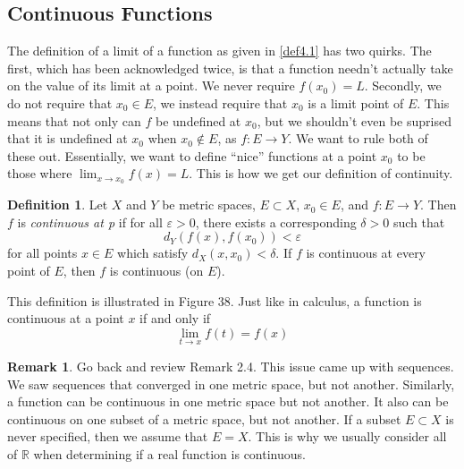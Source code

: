 \documentclass{article}
\newcommand{\R}{\mathbb{R}}
\theoremstyle{definition}
\newtheorem{definition}{Definition}[section]
\newtheorem{remark}{Remark}[section]
\begin{document}
	\subsection{Continuous Functions}
	The definition of a limit of a function as given in \cref{def4.1} has two quirks. The first, which has been acknowledged twice, is that a function needn't actually take on the value of its limit at a point. We never require $ f(x_0)=L $. Secondly, we do not require that $ x_0\in E $, we instead require that $ x_0$ is a limit point of $ E $. This means that not only can $ f $ be undefined at $ x_0$, but we shouldn't even be suprised that it is undefined at $ x_0 $ when $ x_0\notin E $, as $ f:E\to Y $. We want to rule both of these out. Essentially, we want to define ``nice'' functions at a point $ x_0 $ to be those where $ \lim_{x\to x_0}f(x)=L $. This is how we get our definition of continuity. 
	\begin{definition}\label{def4.2}
		Let $ X $ and $ Y $ be metric spaces,  $ E\subset X $, $ x_0\in E $, and $ f:E\to Y $. Then $ f $ is \textit{\color{red}continuous at p} if for all $ \varepsilon>0 $, there exists a corresponding $ \delta>0 $ such that $$ d_Y(f(x),f(x_0))<\varepsilon $$ for all points $ x\in E $ which satisfy $ d_X(x,x_0)<\delta $. If $ f $ is continuous at every point of $ E $, then $ f $ is {\color{red}continuous (on $ E $)}. 
	\end{definition}
	This definition is illustrated in Figure 38. Just like in calculus, a function is continuous at a point $ x $ if and only if $$\lim\limits_{t\to x}f(t)=f(x) $$
	\begin{remark}
		Go back and review Remark 2.4. This issue came up with sequences. We saw sequences that converged in one metric space, but not another. Similarly, a function can be continuous in one metric space but not another. It also can be continuous on one subset of a metric space, but not another. If a subset $ E\subset X $ is never specified, then we assume that $ E=X $. This is why we usually consider all of $ \R $ when determining if a real function is continuous.
	\end{remark}
\end{document}
